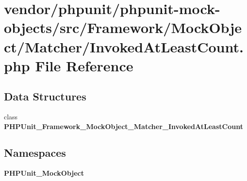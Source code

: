 \section{vendor/phpunit/phpunit-\/mock-\/objects/src/\+Framework/\+Mock\+Object/\+Matcher/\+Invoked\+At\+Least\+Count.php File Reference}
\label{_invoked_at_least_count_8php}
\subsection*{Data Structures}
\begin{DoxyCompactItemize}
\item 
class {\bf P\+H\+P\+Unit\+\_\+\+Framework\+\_\+\+Mock\+Object\+\_\+\+Matcher\+\_\+\+Invoked\+At\+Least\+Count}
\end{DoxyCompactItemize}
\subsection*{Namespaces}
\begin{DoxyCompactItemize}
\item 
 {\bf P\+H\+P\+Unit\+\_\+\+Mock\+Object}
\end{DoxyCompactItemize}
